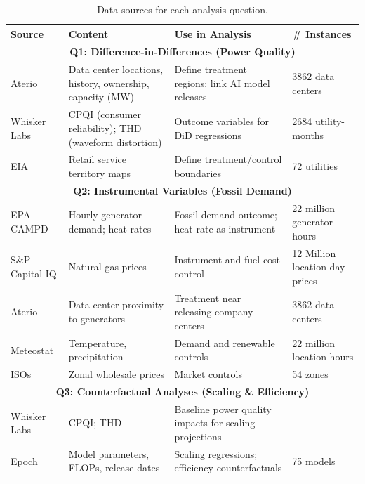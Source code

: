 \documentclass[sigconf]{acmart}
\begin{document}
\begin{table}[htbp]
\scriptsize %
\centering
\caption{Data sources for each analysis question.}
\label{tab:DataSources}
\begin{threeparttable}
\begin{tabularx}{\linewidth}{lXXl}
\toprule
\textbf{Source} & \textbf{Content} & \textbf{Use in Analysis} & \textbf{\# Instances} \\
\midrule
\multicolumn{4}{c}{\textbf{Q1: Difference-in-Differences (Power Quality)}} \\
\midrule
Aterio & Data center locations, history, ownership, capacity (MW) & Define treatment regions; link AI model releases & 3862 data centers\\
Whisker Labs & CPQI (consumer reliability); THD (waveform distortion) & Outcome variables for DiD regressions & 2684 utility-months\\
EIA & Retail service territory maps & Define treatment/control boundaries & 72 utilities\\
\midrule
\multicolumn{4}{c}{\textbf{Q2: Instrumental Variables (Fossil Demand)}} \\
\midrule
EPA CAMPD & Hourly generator demand; heat rates & Fossil demand outcome; heat rate as instrument & 22 million generator-hours\\
S\&P Capital IQ & Natural gas prices & Instrument and fuel-cost control &12 Million location-day prices \\
Aterio & Data center proximity to generators & Treatment near releasing-company centers & 3862 data centers\\
Meteostat & Temperature, precipitation & Demand and renewable controls & 22 million location-hours\\
ISOs & Zonal wholesale prices & Market controls & 54 zones\\
\midrule
\multicolumn{4}{c}{\textbf{Q3: Counterfactual Analyses (Scaling \& Efficiency)}} \\
\midrule
Whisker Labs & CPQI; THD & Baseline power quality impacts for scaling projections & \\
Epoch & Model parameters, FLOPs, release dates & Scaling regressions; efficiency counterfactuals & 75 models\\
\bottomrule
\end{tabularx}
\end{threeparttable}
\end{table}
\end{document}

